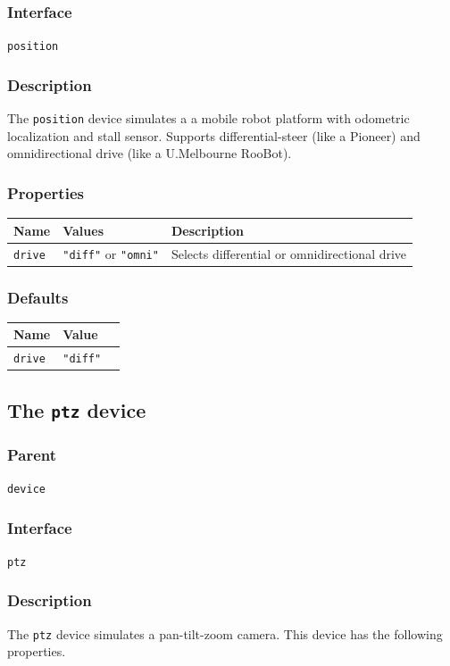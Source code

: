 \documentclass[11pt,twoside]{report}
\begin{document}
\subsubsection*{Interface}
{\tt position}

\subsubsection*{Description}
The {\tt position} device simulates a a mobile robot platform with
odometric localization and stall sensor. Supports differential-steer
(like a Pioneer) and omnidirectional drive (like a U.Melbourne
RooBot).

\subsubsection*{Properties}
\begin{tabularx}{\columnwidth}{llX}
\hline
Name & Values & Description \\
\hline
\verb'drive' & \verb'"diff"' or \verb'"omni"' & Selects differential or omnidirectional drive\\
\hline
\end{tabularx}

\subsubsection*{Defaults}
\begin{tabularx}{\columnwidth}{llX}
\hline Name & Value\\ 
\hline
\verb'drive' & \verb'"diff"'\\
\hline
\end{tabularx}

\newpage
\subsection{The {\tt ptz} device}

\subsubsection*{Parent}
{\tt device}

\subsubsection*{Interface}
{\tt ptz}

\subsubsection*{Description}
The {\tt ptz} device simulates a pan-tilt-zoom camera.
This device has the following properties.
\end{document}
